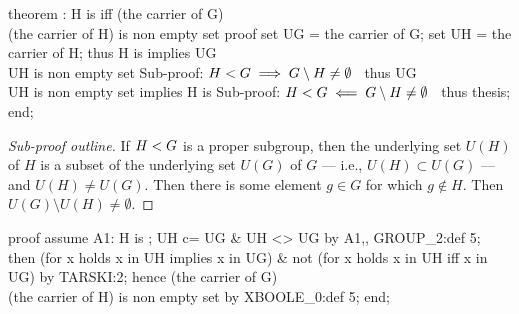 theorem :
  H is  iff (the carrier of G) \\ (the carrier of H) is non empty set
proof
  set UG = the carrier of G;
  set UH = the carrier of H;
  thus H is  implies UG \\ UH is non empty set
  \LA{}Sub-proof: $H< G\implies G\setminus H\neq\emptyset$~{\nwtagstyle{}}\RA{}
  thus UG \\ UH is non empty set implies H is 
  \LA{}Sub-proof: $H< G\impliedby G\setminus H\neq\emptyset$~{\nwtagstyle{}}\RA{}
  thus thesis;
end;
\eatline
{}\nwendcode{}\nwdocspar
\begin{proof}[Sub-proof outline]
  If $H< G$ is a proper subgroup, then the underlying set
  $U(H)$ of $H$ is a subset of the underlying set $U(G)$ of $G$ --- i.e.,
  $U(H)\subset U(G)$ --- and $U(H)\neq U(G)$. Then there is some element
  $g\in G$ for which $g\notin H$. Then $U(G)\setminus U(H)\neq\emptyset$.
\end{proof}

\nwenddocs{}\endmoddef\nwstartdeflinemarkup{}\nwenddeflinemarkup
proof
  assume A1: H is ;
  UH c= UG & UH <> UG by A1,, GROUP_2:def 5;
  then (for x holds x in UH implies x in UG) &
  not (for x holds x in UH iff x in UG) by TARSKI:2;
  hence (the carrier of G) \\ (the carrier of H) is non empty set
  by XBOOLE_0:def 5;
end;
\nwendcode{}\nwdocspar

